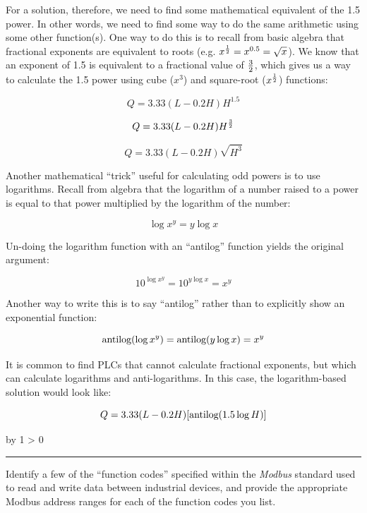 \documentclass[12pt,a4paper]{article}
\def\oppgave{
            \advance\questnum by 1
            \ifnum \questnum > 0
                 \hrule
                 \vskip 3pt
                 \leftline{Oppgave \the\questnum}
                 \vskip 3pt \fi}
\begin{document}
\vskip 10pt

For a solution, therefore, we need to find some mathematical equivalent of the 1.5 power.  In other words, we need to find some way to do the same arithmetic using some other function(s).  One way to do this is to recall from basic algebra that fractional exponents are equivalent to roots (e.g. $x^{1 \over 2} = x^{0.5} = \sqrt{x}$).  We know that an exponent of 1.5 is equivalent to a fractional value of $3 \over 2$, which gives us a way to calculate the 1.5 power using cube ($x^3$) and square-root ($x^{1 \over 2}$) functions:

$$Q = 3.33 (L - 0.2H) H^{1.5}$$

$$Q = 3.33 (L - 0.2H) H^{3 \over 2}$$

$$Q = 3.33 (L - 0.2H) \sqrt{H^{3}}$$

Another mathematical ``trick'' useful for calculating odd powers is to use logarithms.  Recall from algebra that the logarithm of a number raised to a power is equal to that power multiplied by the logarithm of the number:

$$\log x^y = y \log x$$

Un-doing the logarithm function with an ``antilog'' function yields the original argument:

$$10^{\log x^y} = 10^{y \log x} = x^y$$

Another way to write this is to say ``antilog'' rather than to explicitly show an exponential function:

$$\hbox{antilog}(\log x^y) = \hbox{antilog}(y \log x) = x^y$$

It is common to find PLCs that cannot calculate fractional exponents, but which can calculate logarithms and anti-logarithms.  In this case, the logarithm-based solution would look like:

$$Q = 3.33 (L - 0.2H) [\hbox{antilog}(1.5 \log H)]$$


\vfil \eject 


\oppgave{} 

Identify a few of the ``function codes'' specified within the {\it Modbus} standard used to read and write data between industrial devices, and provide the appropriate Modbus address ranges for each of the function codes you list.
\end{document}
